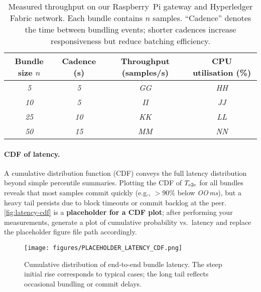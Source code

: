 \documentclass[12pt,onecolumn]{IEEEtran} %
\begin{document}
\begin{table}[h]
  \centering
  \caption{Measured throughput on our Raspberry~Pi gateway and Hyperledger
  Fabric network.  Each bundle contains $n$ samples.  ``Cadence'' denotes the
  time between bundling events; shorter cadences increase responsiveness but
  reduce batching efficiency.}
  \label{tab:throughput}
  \begin{tabular}{cccc}
    \toprule
    Bundle size $n$ & Cadence (s) & Throughput (samples/s) & CPU
    utilisation (\%) \\
    \midrule
    \textit{5} & \textit{5} & \textit{GG} & \textit{HH} \\
    \textit{10} & \textit{5} & \textit{II} & \textit{JJ} \\
    \textit{25} & \textit{10} & \textit{KK} & \textit{LL} \\
    \textit{50} & \textit{15} & \textit{MM} & \textit{NN} \\
    \bottomrule
  \end{tabular}
\end{table}

\paragraph{CDF of latency.}  A cumulative distribution function (CDF) conveys
the full latency distribution beyond simple percentile summaries.  Plotting the
CDF of $T_{\rm e2e}$ for all bundles reveals that most samples commit quickly
(e.g., $>\!90\%$ below \textit{OO\,ms}), but a heavy tail persists due to
block timeouts or commit backlog at the peer.  \autoref{fig:latency-cdf} is a
\textbf{placeholder for a CDF plot}; after performing your measurements,
generate a plot of cumulative probability vs.~latency and replace the
placeholder figure file path accordingly.

\begin{figure}[h]
  \centering
  \texttt{[image: figures/PLACEHOLDER\_LATENCY\_CDF.png]}
  \caption{Cumulative distribution of end‑to‑end bundle latency.  The steep
  initial rise corresponds to typical cases; the long tail reflects occasional
  bundling or commit delays.}
  \label{fig:latency-cdf}
\end{figure}
\end{document}
